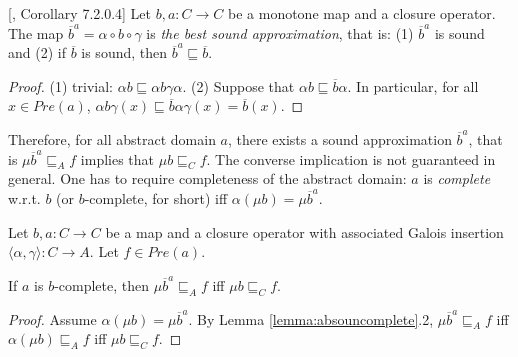 \documentclass{llncs}
\begin{document}
\begin{proposition}\label{prop:alwayssound}[\cite{cousot1979systematic}, Corollary 7.2.0.4]
Let $b,a\colon C \to C$ be a monotone map and a closure operator.
The map $\overline{b}^a = \alpha \circ b \circ \gamma $ is \emph{the best sound approximation}, that is: (1) $\overline{b}^a$ is sound and (2) if $\overline{b}$ is sound, then  $\overline{b}^a \sqsubseteq \overline{b}$.
\end{proposition}
%
\begin{proof}
(1) trivial: $\alpha b \sqsubseteq \alpha b \gamma \alpha$. (2) Suppose that $\alpha b \sqsubseteq \overline{b} \alpha$. In particular, for all $x\in Pre(a)$, $\alpha b \gamma (x)\sqsubseteq \overline{b} \alpha \gamma(x) = \overline{b}(x)$.
\end{proof}

Therefore, for all abstract domain $a$, there exists a sound approximation $\overline{b}^a$, that is $\mu \overline{b}^a \sqsubseteq_A f$ implies that $\mu b \sqsubseteq_C f$.
The converse implication is not guaranteed in general. One has to require completeness of the abstract domain: $a$ is \emph{complete} w.r.t. $b$ (or $b$-complete, for short) iff $\alpha(\mu b) = \mu  \overline{b}^a$.

\begin{lemma}
Let $b,a\colon C \to C$ be a map and a closure operator with associated Galois insertion $\langle \alpha, \gamma \rangle \colon C \to A$. Let $f\in Pre(a)$.

If $a$ is $b$-complete, then $\mu \overline{b}^a \sqsubseteq_A f$ iff $\mu b \sqsubseteq_C f$.
\end{lemma}
%
\begin{proof}
Assume $\alpha(\mu b) = \mu \overline{b}^a$. By Lemma \ref{lemma:absouncomplete}.2, $\mu \overline{b}^a \sqsubseteq_A f$ iff $\alpha(\mu b)  \sqsubseteq_A f$ iff $\mu b \sqsubseteq_C f$.
\end{proof}
\end{document}

